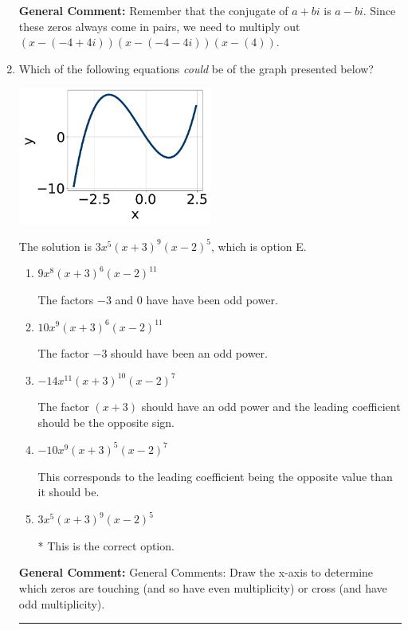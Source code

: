 \documentclass{extbook}[14pt]
\newcommand{\litem}[1]{\item #1

\rule{\textwidth}{0.4pt}}
\begin{document}
\begin{enumerate}
{\textbf{General Comment:} Remember that the conjugate of $a+bi$ is $a-bi$. Since these zeros always come in pairs, we need to multiply out $(x-(-4 + 4 i))(x-(-4 - 4 i))(x-(4))$.
}
\litem{
Which of the following equations \textit{could} be of the graph presented below?

\begin{center}
    \includegraphics[width=0.5\textwidth]{../Figures/polyGraphToFunctionB.png}
\end{center}



The solution is \( 3x^{5} (x + 3)^{9} (x - 2)^{5} \), which is option E.\begin{enumerate}[label=\Alph*.]
\item \( 9x^{8} (x + 3)^{6} (x - 2)^{11} \)

The factors $-3$ and $0$ have have been odd power.
\item \( 10x^{9} (x + 3)^{6} (x - 2)^{11} \)

The factor $-3$ should have been an odd power.
\item \( -14x^{11} (x + 3)^{10} (x - 2)^{7} \)

The factor $(x + 3)$ should have an odd power and the leading coefficient should be the opposite sign.
\item \( -10x^{9} (x + 3)^{5} (x - 2)^{7} \)

This corresponds to the leading coefficient being the opposite value than it should be.
\item \( 3x^{5} (x + 3)^{9} (x - 2)^{5} \)

* This is the correct option.
\end{enumerate}

\textbf{General Comment:} General Comments: Draw the x-axis to determine which zeros are touching (and so have even multiplicity) or cross (and have odd multiplicity).
}
\end{enumerate}
\end{document}
